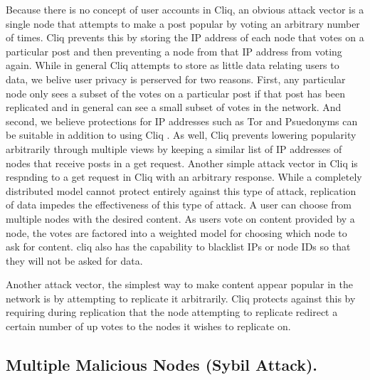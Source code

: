 \documentclass{sig-alternate}
\begin{document}
Because there is no concept of user accounts in Cliq, an obvious attack vector is a single node that attempts to make a post popular by voting an arbitrary number of times. 
Cliq prevents this by storing the IP address of each node that votes on a particular post and then preventing a node from that IP address from voting again. 
While in general Cliq attempts to store as little data relating users to data, we belive user privacy is perserved for two reasons.
First, any particular node only sees a subset of the votes on a particular post if that post has been replicated and in general can see a small subset of votes in the network. 
And second, we believe protections for IP addresses such as Tor and
Psuedonyms can be suitable in addition to using Cliq \cite{tor, pseudonyms}. 
As well, Cliq prevents lowering popularity arbitrarily through multiple views by keeping a similar list of IP addresses of nodes that receive posts in a get request. 
Another simple attack vector in Cliq is respnding to a get request in Cliq with an arbitrary response. 
While a completely distributed model cannot protect entirely against this type of attack, replication of data impedes the effectiveness of this type of attack. A user can choose from multiple nodes with the desired content. As users vote on content provided by a node, the votes are factored into a weighted model for choosing which node to ask for content. cliq also has the capability to blacklist IPs or node IDs so that they will not be asked for data. 
 
Another attack vector, the simplest way to make content appear popular in the network is by attempting to replicate it arbitrarily. 
Cliq protects against this by requiring during replication that the node attempting to replicate redirect a certain number of up votes to the nodes it wishes to replicate on. 



\subsection{Multiple Malicious Nodes (Sybil Attack).}
\label{subsec:spammulti}
\end{document}
